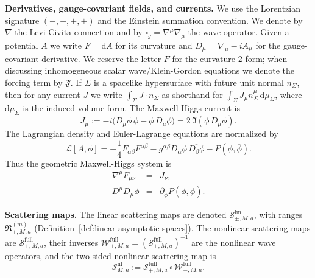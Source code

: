 \documentclass[11pt]{article}
\numberwithin{equation}{section}
\theoremstyle{plain}
\theoremstyle{definition}
\theoremstyle{remark}
\newcommand{\dd}{\mathrm{d}}
\begin{document}
\medskip
\noindent\textbf{Derivatives, gauge-covariant fields, and currents.}
We use the Lorentzian signature $(-,+,+,+)$ and the Einstein summation convention.
We denote by $\nabla$ the Levi-Civita connection and by $\square_{g}=\nabla^{\mu}\nabla_{\mu}$ the wave operator.
Given a potential $A$ we write $F=\dd A$ for its curvature and $D_{\mu}=\nabla_{\mu}-iA_{\mu}$ for the gauge-covariant derivative.
We reserve the letter $F$ for the curvature $2$-form; when discussing inhomogeneous scalar wave/Klein-Gordon equations we denote the forcing term by $\mathfrak{F}$.
If $\Sigma$ is a spacelike hypersurface with future unit normal $n_{\Sigma}$, then for any current $J$ we write
$\int_{\Sigma}J\cdot n_{\Sigma}$ as shorthand for $\int_{\Sigma}J_{\mu}n_{\Sigma}^{\mu}\,\dd\mu_{\Sigma}$, where $\dd\mu_{\Sigma}$ is the induced volume form.
The Maxwell-Higgs current is
\begin{equation}\label{eq:mh-current}
J_{\mu}:=-i\bigl(D_{\mu}\phi\,\overline\phi-\phi\,\overline{D_{\mu}\phi}\bigr)=2\,\Im(\overline\phi\,D_{\mu}\phi).
\end{equation}
The Lagrangian density and Euler-Lagrange equations are normalized by
\begin{equation}\label{lagrangian}
\mathcal L[A,\phi]
=-\frac14 F_{\alpha\beta}F^{\alpha\beta}
-g^{\alpha\beta}D_{\alpha}\phi\,\overline{D_{\beta}\phi}
-P(\phi,\overline\phi).
\end{equation}
Thus the geometric Maxwell-Higgs system is
\begin{eqnarray}
\nabla^{\mu}F_{\mu\nu}&=&J_{\nu},
\label{eom1}\\
D^{\mu}D_{\mu}\phi&=&\partial_{\overline\phi}P(\phi,\overline\phi).
\label{eom2}
\end{eqnarray}

\medskip
\noindent\textbf{Scattering maps.}
The linear scattering maps are denoted $\mathscr S_{\pm,M,a}^{\mathrm{lin}}$, with ranges $\mathfrak R_{\pm,M,a}^{(m)}$ (Definition~\ref{def:linear-asymptotic-spaces}).
The nonlinear scattering maps are $\mathscr S_{\pm,M,a}^{\mathrm{full}}$, their inverses $\mathscr W_{\pm,M,a}^{\mathrm{full}}=(\mathscr S_{\pm,M,a}^{\mathrm{full}})^{-1}$ are the nonlinear wave operators, and the two-sided nonlinear scattering map is
\begin{equation}
\mathscr S_{M,a}^{\mathrm{nl}}:=\mathscr S_{+,M,a}^{\mathrm{full}}\circ\mathscr W_{-,M,a}^{\mathrm{full}}.
\end{equation}
\end{document}

